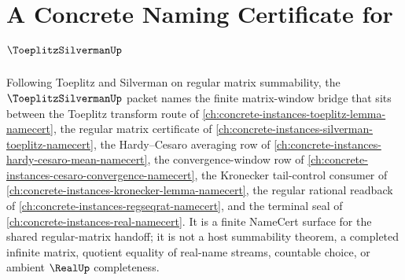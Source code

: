 \chapter{A Concrete Naming Certificate for $\ToeplitzSilvermanUp$}
\label{ch:concrete-instances-toeplitz-silverman-namecert}

Following Toeplitz and Silverman on regular matrix summability, the $\ToeplitzSilvermanUp$ packet names the finite matrix-window bridge that sits between the Toeplitz transform route of \autoref{ch:concrete-instances-toeplitz-lemma-namecert}, the regular matrix certificate of \autoref{ch:concrete-instances-silverman-toeplitz-namecert}, the Hardy--Cesaro averaging row of \autoref{ch:concrete-instances-hardy-cesaro-mean-namecert}, the convergence-window row of \autoref{ch:concrete-instances-cesaro-convergence-namecert}, the Kronecker tail-control consumer of \autoref{ch:concrete-instances-kronecker-lemma-namecert}, the regular rational readback of \autoref{ch:concrete-instances-regseqrat-namecert}, and the terminal seal of \autoref{ch:concrete-instances-real-namecert}. It is a finite NameCert surface for the shared regular-matrix handoff; it is not a host summability theorem, a completed infinite matrix, quotient equality of real-name streams, countable choice, or ambient $\RealUp$ completeness.

